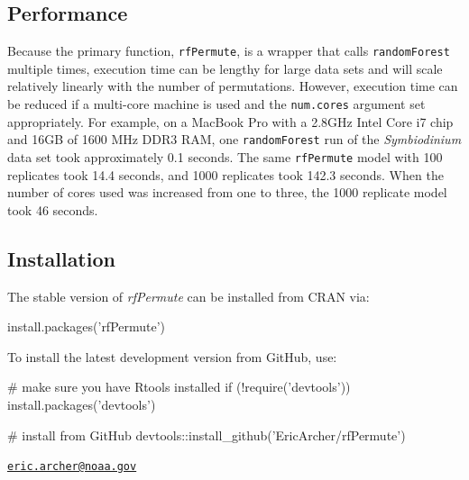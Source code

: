 \subsection{Performance}\label{performance}

Because the primary function, \texttt{rfPermute}, is a wrapper that
calls \texttt{randomForest} multiple times, execution time can be
lengthy for large data sets and will scale relatively linearly with the
number of permutations. However, execution time can be reduced if a
multi-core machine is used and the \texttt{num.cores} argument set
appropriately. For example, on a MacBook Pro with a 2.8GHz Intel Core i7
chip and 16GB of 1600 MHz DDR3 RAM, one \texttt{randomForest} run of the
\emph{Symbiodinium} data set took approximately 0.1 seconds. The same
\texttt{rfPermute} model with 100 replicates took 14.4 seconds, and 1000
replicates took 142.3 seconds. When the number of cores used was
increased from one to three, the 1000 replicate model took 46 seconds.

\subsection{Installation}\label{installation}

The stable version of \emph{rfPermute} can be installed from CRAN via:

\begin{Schunk}
\begin{Sinput}
install.packages('rfPermute')
\end{Sinput}
\end{Schunk}

To install the latest development version from GitHub, use:

\begin{Schunk}
\begin{Sinput}
# make sure you have Rtools installed
if (!require('devtools')) install.packages('devtools')

# install from GitHub
devtools::install_github('EricArcher/rfPermute')
\end{Sinput}
\end{Schunk}



\address{%
Frederick I. Archer\\
Southwest Fisheries Science Center\\
8901 La Jolla Shores Drive\\ La Jolla, CA 92037 USA\\
}
\href{mailto:eric.archer@noaa.gov}{\nolinkurl{eric.archer@noaa.gov}}

